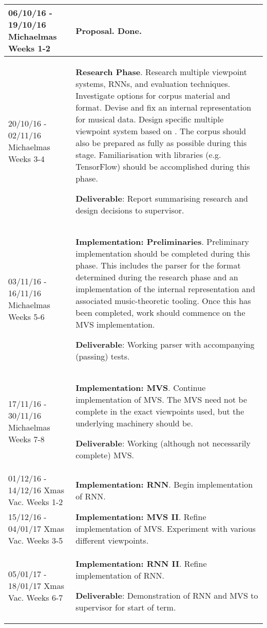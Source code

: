 \documentclass[12pt,a4paper,twoside]{article}
\begin{document}
\begin{longtable}{ p{4cm} | p{11cm} } \hline 

06/10/16 - 19/10/16 Michaelmas Weeks 1-2 & \textbf{Proposal}. Done. \\ \hline
20/10/16 - 02/11/16 Michaelmas Weeks 3-4 & \textbf{Research Phase}. 
Research multiple viewpoint systems, RNNs, and evaluation techniques.
Investigate options for corpus material and format. Devise and fix an internal
representation for musical data. Design specific multiple viewpoint system based
on \cite{whorley2013phd}. The corpus should also be prepared as fully as
possible during this stage. Familiarisation with libraries (e.g. TensorFlow)
should be accomplished during this phase.

\textbf{Deliverable}: Report summarising research and design decisions to
supervisor.
\\ \hline
03/11/16 - 16/11/16 Michaelmas Weeks 5-6 & \textbf{Implementation:
	Preliminaries}.
Preliminary implementation should be completed during this phase. This includes
the parser for the format determined during the research phase and an
implementation of the internal representation and associated music-theoretic
tooling. Once this has been completed, work should commence on the MVS
implementation.

\textbf{Deliverable}: Working parser with accompanying (passing) tests.
\\ \hline

17/11/16 - 30/11/16 Michaelmas Weeks 7-8 & \textbf{Implementation: MVS}.
Continue implementation of MVS. The MVS need not be complete in the exact
viewpoints used, but the underlying machinery should be.

\textbf{Deliverable}: Working (although not necessarily complete) MVS.
\\ \hline

01/12/16 - 14/12/16 Xmas Vac. Weeks 1-2 & \textbf{Implementation: RNN}.
Begin implementation of RNN.  \\ \hline
15/12/16 - 04/01/17 Xmas Vac. Weeks 3-5 & \textbf{Implementation: MVS II}.
Refine implementation of MVS. Experiment with various different viewpoints.

\\ \hline
05/01/17 - 18/01/17 Xmas Vac. Weeks 6-7 & \textbf{Implementation: RNN II}.
Refine implementation of RNN. 

\textbf{Deliverable}: Demonstration of RNN and MVS to supervisor for start of
term.
\\ \hline


\end{longtable}
\end{document}
